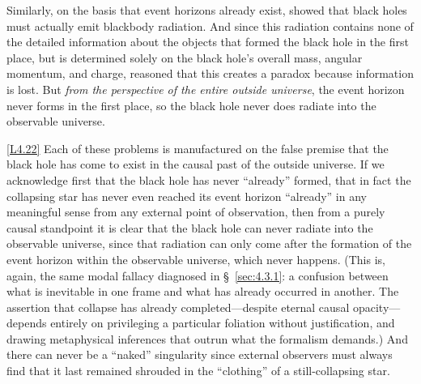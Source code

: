 \documentclass[12pt]{book}
\newcounter{logicanchor}
\newenvironment{logicanchorenv}[1]{\refstepcounter{logicanchor}\label{#1}}{}
\newcommand{\logiclink}[2]{\begin{logicanchorenv}{logic:#1}\end{logicanchorenv}\hyperref[appendix:#1]{[#1]}\xspace}
\begin{document}
Similarly, on the basis that event horizons already exist, \citet{Hawking1975} showed that black holes must actually emit blackbody radiation. And since this radiation contains none of the detailed information about the objects that formed the black hole in the first place, but is determined solely on the black hole's overall mass, angular momentum, and charge, \citet{Hawking1976} reasoned that this creates a paradox because information is lost. But \textit{from the perspective of the entire outside universe}, the event horizon never forms in the first place, so the black hole never does radiate into the observable universe. 

\logiclink{L4.22}{} Each of these problems is manufactured on the false premise that the black hole has come to exist in the causal past of the outside universe. If we acknowledge first that the black hole has never ``already'' formed, that in fact the collapsing star has never even reached its event horizon ``already'' in any meaningful sense from any external point of observation, then from a purely causal standpoint it is clear that the black hole can never radiate into the observable universe, since that radiation can only come after the formation of the event horizon within the observable universe, which never happens. (This is, again, the same modal fallacy diagnosed in \S~\ref{sec:4.3.1}: a confusion between what is inevitable in one frame and what has already occurred in another. The assertion that collapse has already completed---despite eternal causal opacity---depends entirely on privileging a particular foliation without justification, and drawing metaphysical inferences that outrun what the formalism demands.) And there can never be a ``naked'' singularity since external observers must always find that it last remained shrouded in the ``clothing'' of a still-collapsing star.
\end{document}

